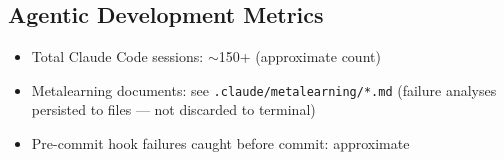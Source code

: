 
\subsection{Agentic Development Metrics}

\begin{itemize}
  \item[APPROX] Total Claude Code sessions: $\sim$150+ (approximate count)
  \item[APPROX] Metalearning documents: see \texttt{.claude/metalearning/*.md}
        (failure analyses persisted to files --- not discarded to terminal)
  \item[APPROX] Pre-commit hook failures caught before commit: approximate
\end{itemize}


